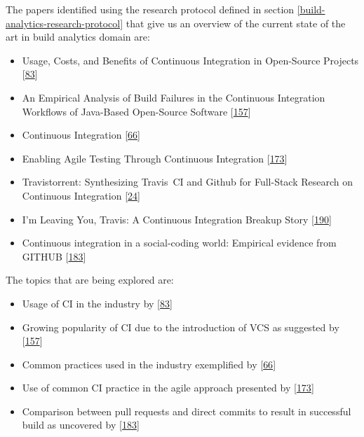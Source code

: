 \documentclass[]{book}
\providecommand{\tightlist}{%
  \setlength{\itemsep}{0pt}\setlength{\parskip}{0pt}}
\begin{document}
The papers identified using the research protocol defined in section
\ref{build-analytics-research-protocol} that give us an overview of the
current state of the art in build analytics domain are:

\begin{itemize}
\tightlist
\item
  Usage, Costs, and Benefits of Continuous Integration in Open-Source
  Projects {[}\protect\hyperlink{ref-hilton2016usage}{83}{]}
\item
  An Empirical Analysis of Build Failures in the Continuous Integration
  Workflows of Java-Based Open-Source Software
  {[}\protect\hyperlink{ref-rausch2017empirical}{157}{]}
\item
  Continuous Integration
  {[}\protect\hyperlink{ref-fowler2006continuous}{66}{]}
\item
  Enabling Agile Testing Through Continuous Integration
  {[}\protect\hyperlink{ref-stolberg2009enabling}{173}{]}
\item
  Travistorrent: Synthesizing Travis~CI and Github for Full-Stack
  Research on Continuous Integration
  {[}\protect\hyperlink{ref-beller2017travistorrent}{24}{]}
\item
  I'm Leaving You, Travis: A Continuous Integration Breakup Story
  {[}\protect\hyperlink{ref-widder2018m}{190}{]}
\item
  Continuous integration in a social-coding world: Empirical evidence
  from GITHUB {[}\protect\hyperlink{ref-vasilescu2014continuous}{183}{]}
\end{itemize}

The topics that are being explored are:

\begin{itemize}
\tightlist
\item
  Usage of CI in the industry by
  {[}\protect\hyperlink{ref-hilton2016usage}{83}{]}
\item
  Growing popularity of CI due to the introduction of VCS as suggested
  by {[}\protect\hyperlink{ref-rausch2017empirical}{157}{]}
\item
  Common practices used in the industry exemplified by
  {[}\protect\hyperlink{ref-fowler2006continuous}{66}{]}
\item
  Use of common CI practice in the agile approach presented by
  {[}\protect\hyperlink{ref-stolberg2009enabling}{173}{]}
\item
  Comparison between pull requests and direct commits to result in
  successful build as uncovered by
  {[}\protect\hyperlink{ref-vasilescu2014continuous}{183}{]}
\end{itemize}
\end{document}
